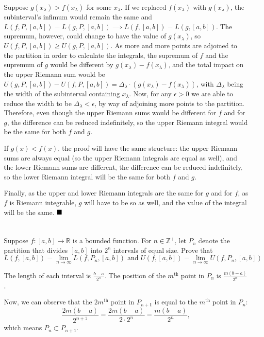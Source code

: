 \documentclass[11pt, a4paper, tikz]{article}
\newcommand{\centsection}[1]{
	\section*{\centering{#1}}
}
\renewcommand{\qed}{\hfill\blacksquare}
\newcommand{\integers}{
	\ensuremath{\mathbb{Z}}
}
\newcommand{\reals}{
	\ensuremath{\mathbb{R}}
}
\begin{document}
	Suppose $g(x_\lambda) > f(x_\lambda)$ for some $x_\lambda$. If we replaced $f(x_\lambda)$ with $g(x_\lambda)$, the subinterval's infimum would remain the same and $L(f,P,[a,b]) = L(g,P,[a,b])\implies L(f,[a,b])=L(g,[a,b])$. The supremum, however, could change to have the value of $g(x_\lambda)$, so $U(f,P,[a,b]) \geq U(g,P,[a,b])$. As more and more points are adjoined to the partition in order to calculate the integrals, the supremum of $f$ and the supremum of $g$ would be different by $g(x_\lambda)-f(x_\lambda)$, and the total impact on the upper Riemann sum would be $U(g,P,[a,b])-U(f,P,[a,b]) = \Delta_\lambda\cdot(g(x_\lambda)-f(x_\lambda))$, with $\Delta_\lambda$ being the width of the subinterval containing $x_\lambda$. Now, for any $\epsilon>0$ we are able to reduce the width to be $\Delta_\lambda<\epsilon$, by way of adjoining more points to the partition. Therefore, even though the upper Riemann sums would be different for $f$ and for $g$, the difference can be reduced indefinitely, so the upper Riemann integral would be the same for both $f$ and $g$.
	
	If $g(x) < f(x)$, the proof will have the same structure: the upper Riemann sums are always equal (so the upper Riemann integrals are equal as well), and the lower Riemann sums are different, the difference can be reduced indefinitely, so the lower Riemann integral will be the same for both $f$ and $g$.
	
	Finally, as the upper and lower Riemann integrals are the same for $g$ and for $f$, as $f$ is Riemann integrable, $g$ will have to be so as well, and the value of the integral will be the same.
	$\qed$
	
	\centsection{Exercise 7}
	
	\begin{formulationBox}
		Suppose $f:[a,b]\rightarrow\reals$ is a bounded function. For $n\in\integers^+$, let $P_n$ denote the partition that divides $[a,b]$ into $2^n$ intervals of equal size. Prove that \[L(f,[a,b]) = \lim_{n\rightarrow\infty}L(f,P_n,[a,b]) \textrm{ and } U(f,[a,b]) = \lim_{n\rightarrow\infty}U(f,P_n,[a,b])\]
	\end{formulationBox}
	
	The length of each interval is $\frac{b-a}{2^n}$. The position of the $m^\textrm{th}$ point in $P_n$ is $\frac{m(b-a)}{2^n}$.
	
	Now, we can observe that the $2m^\textrm{th}$ point in $P_{n+1}$ is equal to the $m^\textrm{th}$ point in $P_n$: \[\frac{2m(b-a)}{2^{n+1}} = \frac{2m(b-a)}{2\cdot2^n} = \frac{m(b-a)}{2^n},\] which means $P_n \subset P_{n+1}$.
	
\end{document}
